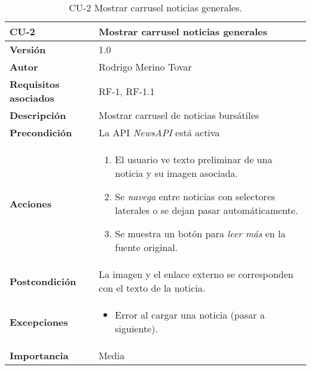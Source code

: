 \begin{table}[p]
	\centering
	\begin{tabularx}{\linewidth}{ p{} p{} }
		\toprule
		\textbf{CU-2}    & \textbf{Mostrar carrusel noticias generales}\\
		\toprule
		\textbf{Versión}              & 1.0    \\
		\textbf{Autor}                & Rodrigo Merino Tovar \\
		\textbf{Requisitos asociados} & RF-1, RF-1.1 \\
		\textbf{Descripción}          & Mostrar carrusel de noticias bursátiles\\
		\textbf{Precondición}         & La API \emph{NewsAPI} está activa \\
		\textbf{Acciones}             &
		\begin{enumerate}
			\def\labelenumi{\arabic{enumi}.}
			\tightlist
			\item El usuario ve texto preliminar de una noticia y su imagen asociada. 
			\item Se \emph{navega} entre noticias con selectores laterales o se dejan pasar automáticamente.
			\item Se muestra un botón para \emph{leer más} en la fuente original.
		\end{enumerate}\\
		\textbf{Postcondición}        & La imagen y el enlace externo se corresponden con el texto de la noticia.  \\
		\textbf{Excepciones}          & 
		\begin{itemize}
			\tightlist
			\item Error al cargar una noticia (pasar a siguiente). 
		\end{itemize}\\
		\textbf{Importancia}          & Media \\
		\bottomrule
	\end{tabularx}
	\caption{CU-2 Mostrar carrusel noticias generales.}
\end{table}



